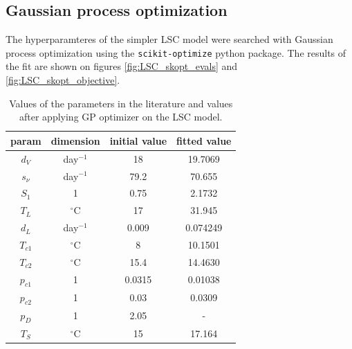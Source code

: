 \documentclass[11pt, a4paper]{article}
\begin{document}
\subsection*{Gaussian process optimization}
The hyperparamteres of the simpler LSC model were searched with Gaussian process optimization using the \texttt{scikit-optimize}
python package. The results of the fit are shown on figures \ref{fig:LSC_skopt_evals} and \ref{fig:LSC_skopt_objective}.
\begin{table}[H]
    \centering
    \begin{tabular}{|c|c|c|c|}
    \hline
    param & dimension  & initial value & fitted value \\ \hline
    $d_V$     & day$^{-1}$& 18 & 19.7069 \\ \hline
    $s_{\nu}$ & day$^{-1}$& 79.2 & 70.655 \\ \hline
    $S_1$     & 1 & 0.75 & 2.1732 \\ \hline
    $T_L$     & $^{\circ}$C & 17 & 31.945 \\ \hline
    $d_L$     & day$^{-1}$& 0.009 & 0.074249 \\ \hline
    $T_{c1}$  & $^{\circ}$C & 8 & 10.1501 \\ \hline
    $T_{c2}$  & $^{\circ}$C & 15.4 & 14.4630 \\ \hline
    $p_{c1}$  & 1 & 0.0315 & 0.01038 \\ \hline
    $p_{c2}$  & 1 & 0.03   & 0.0309 \\ \hline
    $p_D$     & 1 & 2.05 & - \\ \hline
    $T_S$     & $^{\circ}$C & 15 &17.164 \\ \hline
    \end{tabular}
    \caption{Values of the parameters in the literature and values after applying GP optimizer on the LSC model.}
\end{table}
\end{document}
